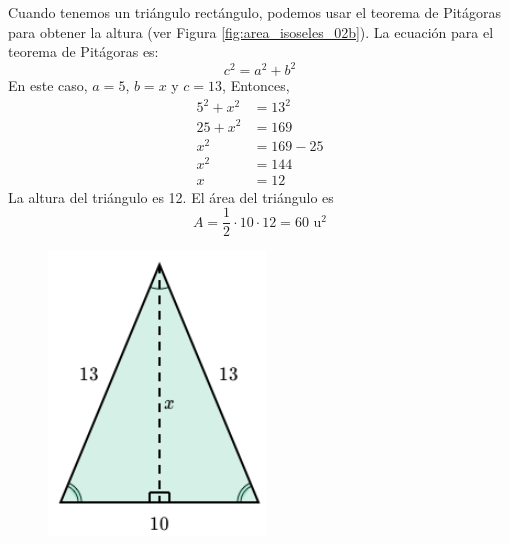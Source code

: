 \begin{solutionbox}{15cm}
\begin{minipage}{0.6\textwidth}
        Cuando tenemos un triángulo rectángulo, podemos usar el teorema de Pitágoras para obtener la altura (ver Figura \ref{fig:area_isoseles_02b}).
        La ecuación para el teorema de Pitágoras es:
        \[c^2=a^2+b^2\]
        En este caso, $a=5$, $b=x$ y $c=13$, Entonces,
        \begin{align*}
            5^2+x^2 & =13^2   \\
            25+x^2  & =169    \\
            x^2     & =169-25 \\
            x^2     & =144    \\
            x       & =12
        \end{align*}
        La altura del triángulo es 12.
        El área del triángulo es
        \[A=\frac{1}{2}\cdot 10 \cdot 12 = 60 \text{ u}^2\]
    \end{minipage}
    \begin{minipage}{0.35\textwidth}
        \begin{figure}[H]
            \centering
            \includegraphics[width=0.6\linewidth]{../images/area_isoseles_02a.png}
            \caption{}
            \label{fig:area_isoseles_02a}
        \end{figure}
        \begin{figure}[H]
            \centering

\end{figure}
\end{minipage}
\end{solutionbox}
